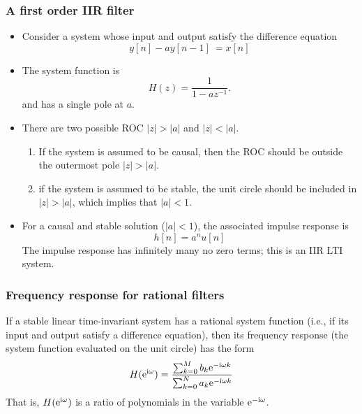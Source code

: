 \begin{frame}
\frametitle{A first order IIR filter}
\begin{itemize}
\item Consider a  system whose input and output satisfy the difference equation
$$
y[n]-ay[n-1]\ =x[n]
$$
\item The system function is
$$
H(z)=\frac{1}{1-az^{-1}}.
$$
and has a \alert{single pole} at $a$.
\item There are two possible ROC $|z| > |a|$ and $|z| < |a|$.
\begin{enumerate}
\item If the system is assumed to be \alert{causal}, then the ROC should be outside the outermost pole  $|z|>|a|$.
\item if the system is assumed to be \alert{stable}, the unit circle should be included in $|z| > |a|$, which implies that $|a|<1$.
\end{enumerate}
\item For a \alert{causal} and \alert{stable} solution ($|a| < 1$), the associated impulse response is
$$
h[n]=a^{n}u[n]
$$
The impulse response has infinitely many no zero terms; this is an IIR LTI system.
\end{itemize}
\end{frame}

\begin{frame}
\frametitle{Frequency response for rational filters}
If a stable linear time-invariant system has a rational system function (i.e., if its input and output satisfy a difference equation), then its frequency response (the system function evaluated on the unit circle) has the form
$$
H(\mathrm{e}^{\mathrm{i}\omega})=\frac{\sum_{k=0}^M b_k \mathrm{e}^{-\mathrm{i} \omega k}}{\sum_{k=0}^N a_k \mathrm{e}^{-\mathrm{i} \omega k}}
$$
That is, $H(\mathrm{e}^{\mathrm{i}\omega})$ is a ratio of polynomials in the variable $\mathrm{e}^{-\mathrm{i}\omega}$.
\end{frame}



 